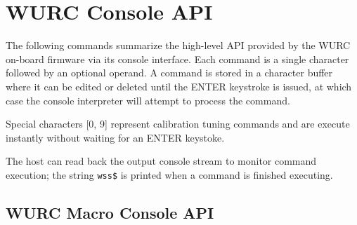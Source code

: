 \chapter{WURC Console API}
\label{sec_wurc_console}

The following commands summarize the high-level \ac{API} provided by the \ac{WURC} on-board firmware via its console interface.
Each command is a single character followed by an optional operand. A command is stored in a character buffer where it can be edited or deleted until the ENTER keystroke is issued, at which case the console interpreter will attempt to process the command.

Special characters [0, 9] represent calibration tuning commands and are execute instantly without waiting for an ENTER keystoke. 

The host can read back the output console stream to monitor command execution; the string \texttt{wss\$} is printed when a command is finished executing.

\section{WURC Macro Console API}

